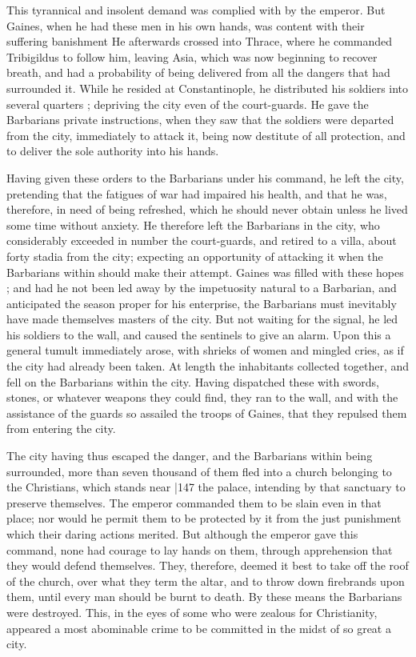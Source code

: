 This tyrannical and insolent demand was complied with by the emperor. But Gaines, when he had these men in his own hands, was content with their suffering banishment He afterwards crossed into Thrace, where he commanded Tribigildus to follow him, leaving Asia, which was now beginning to recover breath, and had a probability of being delivered from all the dangers that had surrounded it. While he resided at Constantinople, he distributed his soldiers into several quarters ; depriving the city even of the court-guards. He gave the Barbarians private instructions, when they saw that the soldiers were departed from the city, immediately to attack it, being now destitute of all protection, and to deliver the sole authority into his hands.

Having given these orders to the Barbarians under his command, he left the city, pretending that the fatigues of war had impaired his health, and that he was, therefore, in need of being refreshed, which he should never obtain unless he lived some time without anxiety. He therefore left the Barbarians in the city, who considerably exceeded in number the court-guards, and retired to a villa, about forty stadia from the city; expecting an opportunity of attacking it when the Barbarians within should make their attempt. Gaines was filled with these hopes ; and had he not been led away by the impetuosity natural to a Barbarian, and anticipated the season proper for his enterprise, the Barbarians must inevitably have made themselves masters of the city. But not waiting for the signal, he led his soldiers to the wall, and caused the sentinels to give an alarm. Upon this a general tumult immediately arose, with shrieks of women and mingled cries, as if the city had already been taken. At length the inhabitants collected together, and fell on the Barbarians within the city. Having dispatched these with swords, stones, or whatever weapons they could find, they ran to the wall, and with the assistance of the guards so assailed the troops of Gaines, that they repulsed them from entering the city.

The city having thus escaped the danger, and the Barbarians within being surrounded, more than seven thousand of them fled into a church belonging to the Christians, which stands near
|147 the palace, intending by that sanctuary to preserve themselves. The emperor commanded them to be slain even in that place; nor would he permit them to be protected by it from the just punishment which their daring actions merited. But although the emperor gave this command, none had courage to lay hands on them, through apprehension that they would defend themselves. They, therefore, deemed it best to take off the roof of the church, over what they term the altar, and to throw down firebrands upon them, until every man should be burnt to death. By these means the Barbarians were destroyed. This, in the eyes of some who were zealous for Christianity, appeared a most abominable crime to be committed in the midst of so great a city.

